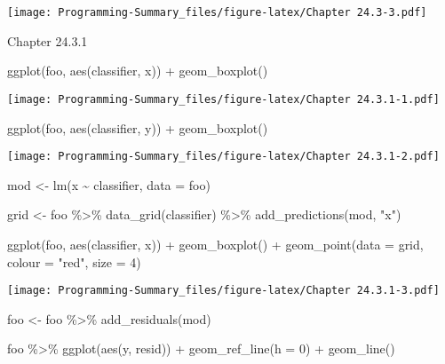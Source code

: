 \documentclass[
]{article}
\newenvironment{Shaded}{\begin{snugshade}}{\end{snugshade}}
\newcommand{\AttributeTok}[1]{\textcolor[rgb]{0.77,0.63,0.00}{#1}}
\newcommand{\DecValTok}[1]{\textcolor[rgb]{0.00,0.00,0.81}{#1}}
\newcommand{\FunctionTok}[1]{\textcolor[rgb]{0.00,0.00,0.00}{#1}}
\newcommand{\NormalTok}[1]{#1}
\newcommand{\OtherTok}[1]{\textcolor[rgb]{0.56,0.35,0.01}{#1}}
\newcommand{\SpecialCharTok}[1]{\textcolor[rgb]{0.00,0.00,0.00}{#1}}
\newcommand{\StringTok}[1]{\textcolor[rgb]{0.31,0.60,0.02}{#1}}
\begin{document}
\texttt{[image: Programming-Summary\_files/figure-latex/Chapter 24.3-3.pdf]}

Chapter 24.3.1

\begin{Shaded}
\begin{Highlighting}[]
\FunctionTok{ggplot}\NormalTok{(foo, }\FunctionTok{aes}\NormalTok{(classifier, x)) }\SpecialCharTok{+} 
  \FunctionTok{geom\_boxplot}\NormalTok{()}
\end{Highlighting}
\end{Shaded}

\texttt{[image: Programming-Summary\_files/figure-latex/Chapter 24.3.1-1.pdf]}

\begin{Shaded}
\begin{Highlighting}[]
\FunctionTok{ggplot}\NormalTok{(foo, }\FunctionTok{aes}\NormalTok{(classifier, y)) }\SpecialCharTok{+} 
  \FunctionTok{geom\_boxplot}\NormalTok{()}
\end{Highlighting}
\end{Shaded}

\texttt{[image: Programming-Summary\_files/figure-latex/Chapter 24.3.1-2.pdf]}

\begin{Shaded}
\begin{Highlighting}[]
\NormalTok{mod }\OtherTok{\textless{}{-}} \FunctionTok{lm}\NormalTok{(x }\SpecialCharTok{\textasciitilde{}}\NormalTok{ classifier, }\AttributeTok{data =}\NormalTok{ foo)}


\NormalTok{grid }\OtherTok{\textless{}{-}}\NormalTok{ foo }\SpecialCharTok{\%\textgreater{}\%} 
  \FunctionTok{data\_grid}\NormalTok{(classifier) }\SpecialCharTok{\%\textgreater{}\%} 
  \FunctionTok{add\_predictions}\NormalTok{(mod, }\StringTok{"x"}\NormalTok{)}

\FunctionTok{ggplot}\NormalTok{(foo, }\FunctionTok{aes}\NormalTok{(classifier, x)) }\SpecialCharTok{+} 
  \FunctionTok{geom\_boxplot}\NormalTok{() }\SpecialCharTok{+}
  \FunctionTok{geom\_point}\NormalTok{(}\AttributeTok{data =}\NormalTok{ grid, }\AttributeTok{colour =} \StringTok{"red"}\NormalTok{, }\AttributeTok{size =} \DecValTok{4}\NormalTok{)}
\end{Highlighting}
\end{Shaded}

\texttt{[image: Programming-Summary\_files/figure-latex/Chapter 24.3.1-3.pdf]}

\begin{Shaded}
\begin{Highlighting}[]
\NormalTok{foo }\OtherTok{\textless{}{-}}\NormalTok{ foo }\SpecialCharTok{\%\textgreater{}\%} 
  \FunctionTok{add\_residuals}\NormalTok{(mod)}

\NormalTok{foo }\SpecialCharTok{\%\textgreater{}\%} 
  \FunctionTok{ggplot}\NormalTok{(}\FunctionTok{aes}\NormalTok{(y, resid)) }\SpecialCharTok{+} 
  \FunctionTok{geom\_ref\_line}\NormalTok{(}\AttributeTok{h =} \DecValTok{0}\NormalTok{) }\SpecialCharTok{+} 
  \FunctionTok{geom\_line}\NormalTok{()}
\end{Highlighting}
\end{Shaded}
\end{document}
